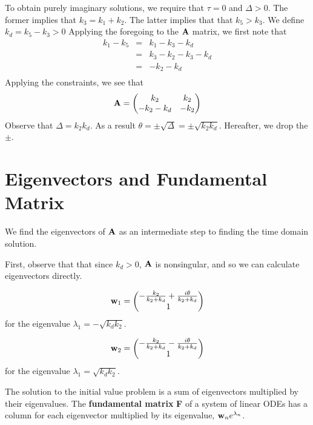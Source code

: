 \documentclass{bmcart}
\begin{document}
To obtain purely imaginary solutions, we require that $\tau =0$ and
$\Delta > 0$. The former implies that $k_3 = k_1 + k_2$. The latter
implies that that $k_5 > k_3$. We define $k_d = k_5 - k_3 > 0$
Applying the foregoing to the ${\bf A}$ matrix, we first note that
\begin{align*}
k_1 - k_5 & = & k_1 - k_3 -k_d \\
& = & k_3 - k_2 - k_3 - k_d \\
& = & -k_2 - k_d \\
\end{align*}
Applying the constraints,
we see that
\begin{equation*}
{\bf A} = 
\begin{pmatrix}
k_2 & k_2 \\
-k_2 - k_d & -k_2 \\
\end{pmatrix}
\end{equation*}
Observe that $\Delta = k_2 k_d$.
As a result
$\theta = \pm \sqrt{\Delta} = \pm \sqrt{k_2 k_d}$. Hereafter, we drop
the $\pm$.

\section{Eigenvectors and Fundamental Matrix}

We find the eigenvectors of ${\bf A}$ as an intermediate step to
finding the time domain solution.

First, observe that that since $k_d > 0$, ${\bf A}$ is nonsingular,
and so we can calculate eigenvectors directly.

\begin{equation*}
    {\bf w}_1 =
    \begin{pmatrix}
- \frac{k_{2}}{k_{2} + k_{d}}
+ \frac{i \theta}{k_{2} + k_{d}} 
\\ 1
\end{pmatrix}
\end{equation*}
for the eigenvalue $\lambda_1 = - \sqrt{k_d k_2}$.

\begin{equation*}
    {\bf w}_2 =
    \begin{pmatrix}
- \frac{k_{2}}{k_{2} + k_{d}}
- \frac{i \theta}{k_{2} + k_{d}} 
\\ 1
\end{pmatrix}
\end{equation*}
for the eigenvalue $\lambda_1 = \sqrt{k_d k_2}$.

The solution to the initial value problem is a sum of eigenvectors
multiplied by their eigenvalues.
The {\bf fundamental matrix} {\bf F} of a system of 
linear ODEs has a column
for each eigenvector multiplied by its eigenvalue,
${\bf w}_n e^{\lambda_n}$.
\end{document}
